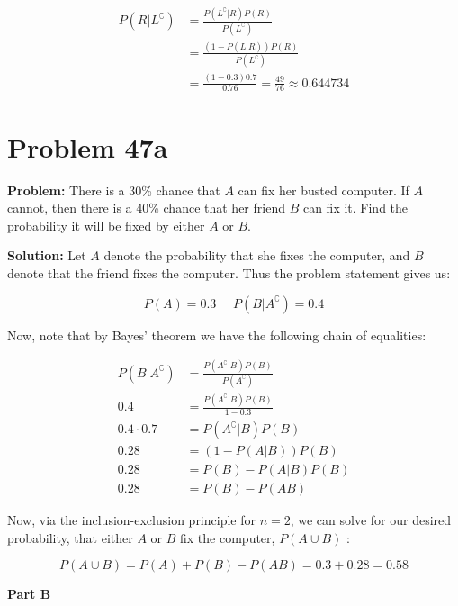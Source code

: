 \documentclass{article}
\begin{document}
\begin{align*}
    P(R| L^\complement)&=\frac{P(L^\complement| R)P(R)}{P(L^\complement)}\tag{Bayes' theorem}\\
    &=\frac{(1-P(L| R))P(R)}{P(L^\complement)}\tag{conditional law of complement}\\
    &=\frac{(1-0.3)0.7}{0.76}=\frac{49}{76}\approx0.644734
\end{align*}

\section*{Problem 47a}
\noindent\textbf{Problem:} There is a 30\% chance that $A$ can fix her busted computer. If $A$ cannot, then there is a 40\% chance that her friend $B$ can fix it. Find the probability it will be fixed by either $A$ or $B$.
\bigskip

\noindent\textbf{Solution:} Let $A$ denote the probability that she fixes the computer, and $B$ denote that the friend fixes the computer. Thus the problem statement gives us:

\begin{equation*}
    P(A)=0.3\,\,\,\,\,\,\,\,P(B| A^\complement)=0.4
\end{equation*}

Now, note that by Bayes' theorem we have the following chain of equalities:

\begin{align*}
    P(B|A^\complement)&=\frac{P(A^\complement| B)P(B)}{P(A^\complement)}\tag{Bayes' theorem}\\
    0.4&=\frac{P(A^\complement| B)P(B)}{1-0.3}\\
    0.4\cdot0.7&=P(A^\complement| B)P(B)\\
    0.28&=(1-P(A| B))P(B)\tag{conditional law of complement}\\
    0.28&=P(B)-P(A| B)P(B)\\
    0.28&=P(B)-P(AB)\tag{def. of conditional probability}
\end{align*}

Now, via the inclusion-exclusion principle for $n=2$, we can solve for our desired probability, that either $A$ or $B$ fix the computer, $P(A\cup B)$ :

\begin{equation*}
    P(A\cup B)=P(A)+P(B)-P(AB)=0.3+0.28=0.58
\end{equation*}

\begin{center}
    \Large\textbf{Part B}
\end{center}
\end{document}
